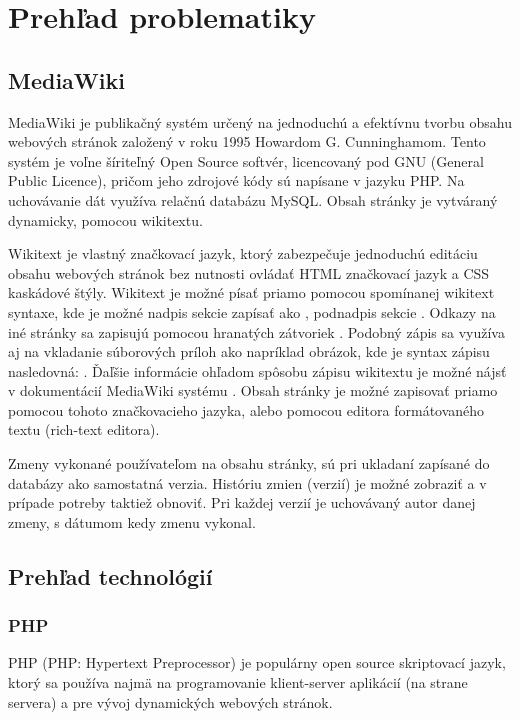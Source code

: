 \chapter{Prehľad problematiky}\label{chap:issues_overview} 

\section{MediaWiki}
MediaWiki je publikačný systém určený na jednoduchú a efektívnu tvorbu obsahu webových stránok založený v roku 1995 Howardom G. Cunninghamom. Tento systém je voľne šíriteľný Open Source softvér, licencovaný pod GNU (General Public Licence), pričom jeho zdrojové kódy sú napísane v jazyku PHP. Na uchovávanie dát využíva relačnú databázu MySQL. Obsah stránky je vytváraný dynamicky, pomocou wikitextu. 

Wikitext je vlastný značkovací jazyk, ktorý zabezpečuje jednoduchú editáciu obsahu webových stránok bez nutnosti ovládať HTML značkovací jazyk a CSS kaskádové štýly. Wikitext je možné písať priamo pomocou spomínanej wikitext syntaxe, kde je možné nadpis sekcie zapísať ako , podnadpis sekcie . Odkazy na iné stránky sa zapisujú pomocou hranatých zátvoriek . Podobný zápis sa využíva aj na vkladanie súborových príloh ako napríklad obrázok, kde je syntax zápisu nasledovná: . Ďaľšie informácie ohľadom spôsobu zápisu wikitextu je možné nájsť v dokumentácií MediaWiki systému \citep{MediaWikiHelpFormating}. Obsah stránky je možné zapisovať priamo pomocou tohoto značkovacieho jazyka, alebo pomocou editora formátovaného textu (rich-text editora).

Zmeny vykonané používateľom na obsahu stránky, sú pri ukladaní zapísané do databázy ako samostatná verzia. Históriu zmien (verzií) je možné zobraziť a v prípade potreby taktiež obnoviť. Pri každej verzií je uchovávaný autor danej zmeny, s dátumom kedy zmenu vykonal. 



\newpage
\section{Prehľad technológií}

\subsection{PHP}
PHP (PHP: Hypertext Preprocessor) je populárny open source skriptovací jazyk, ktorý sa používa najmä na programovanie klient-server aplikácií (na strane servera) a pre vývoj dynamických webových stránok.

